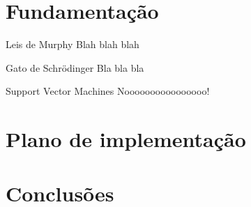 \documentclass{beamer}
\begin{document}
\section{Fundamentação}
\begin{frame}{Leis de Murphy}
 Blah blah blah
\end{frame}
\begin{frame}{Gato de Schrödinger}
 Bla bla bla
\end{frame}
\begin{frame}{Support Vector Machines}
 Noooooooooooooooo!
\end{frame}

\section{Plano de implementação}

\section{Conclusões}
\end{document}
